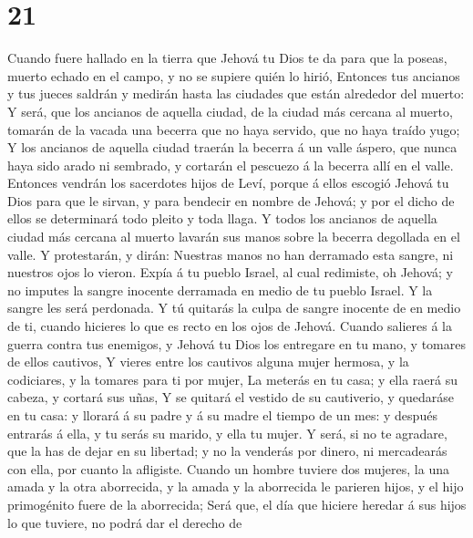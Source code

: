 \hypertarget{section-20}{%
\section{21}\label{section-20}}

 Cuando fuere hallado en la tierra que Jehová tu Dios te
da para que la poseas, muerto echado en el campo, y no se supiere quién
lo hirió,  Entonces tus ancianos y tus jueces saldrán y
medirán hasta las ciudades que están alrededor del muerto:
 Y será, que los ancianos de aquella ciudad, de la ciudad
más cercana al muerto, tomarán de la vacada una becerra que no haya
servido, que no haya traído yugo;  Y los ancianos de
aquella ciudad traerán la becerra á un valle áspero, que nunca haya sido
arado ni sembrado, y cortarán el pescuezo á la becerra allí en el valle.
 Entonces vendrán los sacerdotes hijos de Leví, porque á
ellos escogió Jehová tu Dios para que le sirvan, y para bendecir en
nombre de Jehová; y por el dicho de ellos se determinará todo pleito y
toda llaga.  Y todos los ancianos de aquella ciudad más
cercana al muerto lavarán sus manos sobre la becerra degollada en el
valle.  Y protestarán, y dirán: Nuestras manos no han
derramado esta sangre, ni nuestros ojos lo vieron.  Expía
á tu pueblo Israel, al cual redimiste, oh Jehová; y no imputes la sangre
inocente derramada en medio de tu pueblo Israel. Y la sangre les será
perdonada.  Y tú quitarás la culpa de sangre inocente de
en medio de ti, cuando hicieres lo que es recto en los ojos de Jehová.
 Cuando salieres á la guerra contra tus enemigos, y
Jehová tu Dios los entregare en tu mano, y tomares de ellos cautivos,
 Y vieres entre los cautivos alguna mujer hermosa, y la
codiciares, y la tomares para ti por mujer,  La meterás
en tu casa; y ella raerá su cabeza, y cortará sus uñas, 
Y se quitará el vestido de su cautiverio, y quedaráse en tu casa: y
llorará á su padre y á su madre el tiempo de un mes: y después entrarás
á ella, y tu serás su marido, y ella tu mujer.  Y será,
si no te agradare, que la has de dejar en su libertad; y no la venderás
por dinero, ni mercadearás con ella, por cuanto la afligiste.
 Cuando un hombre tuviere dos mujeres, la una amada y la
otra aborrecida, y la amada y la aborrecida le parieren hijos, y el hijo
primogénito fuere de la aborrecida;  Será que, el día que
hiciere heredar á sus hijos lo que tuviere, no podrá dar el derecho de
